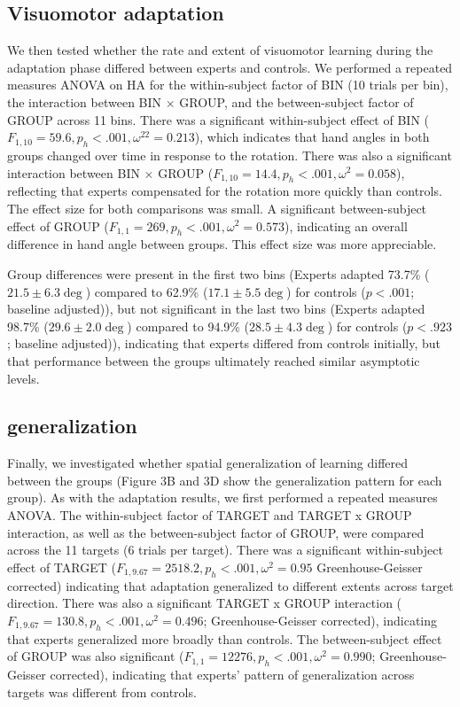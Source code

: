 \documentclass[jou, apacite, 11pt, longtable, floatsintext, notab]{apa6}
\begin{document}
\subsection{Visuomotor adaptation}
We then tested whether the rate and extent of visuomotor
learning during the adaptation phase differed between
experts and controls. We performed a repeated measures ANOVA
on HA for the within-subject factor of BIN (10 trials per
bin), the interaction between BIN $\times$ GROUP, and the
between-subject factor of GROUP across 11 bins. There was a
significant within-subject effect of BIN ($F_{1,10} = 59.6,
p_h <.001, \omega^22 = 0.213$), which indicates that hand
angles in both groups changed over time in response to the
rotation. There was also a significant interaction between
BIN $\times$ GROUP ($F_{1,10} = 14.4, p_h <.001, \omega^2 =
0.058$), reflecting that experts compensated for the
rotation more quickly than controls. The effect size for
both comparisons was small. A significant between-subject
effect of GROUP ($F_{1,1} = 269, p_h <.001, \omega^2 =
0.573$), indicating an overall difference in hand angle
between groups. This effect size was more appreciable.

Group differences were present in the first two bins
(Experts adapted 73.7\% ($21.5 \pm 6.3 \deg$) compared to
62.9\% ($17.1 \pm 5.5 \deg$) for controls ($p<.001$;
baseline adjusted)), but not significant in the last two
bins (Experts adapted 98.7\% ($29.6 \pm 2.0\deg$) compared
to 94.9\% ($28.5 \pm 4.3\deg$) for controls ($p<.923$;
baseline adjusted)), indicating that experts differed from
controls initially, but that performance between the groups
ultimately reached similar asymptotic levels.

\subsection{generalization}
Finally, we investigated whether spatial generalization of
learning differed between the groups (Figure 3B and 3D show
the generalization pattern for each group). As with the
adaptation results, we first performed a repeated measures
ANOVA. The within-subject factor of TARGET and TARGET x
GROUP interaction, as well as the between-subject factor of
GROUP, were compared across the 11 targets (6 trials per
target). There was a significant within-subject effect of
TARGET ($F_{1,9.67} = 2518.2, p_h <.001, \omega^2 = 0.95$
Greenhouse-Geisser corrected) indicating that adaptation
generalized to different extents across target direction.
There was also a significant TARGET x GROUP interaction
($F_{1,9.67} = 130.8, p_h <.001, \omega^2 = 0.496$;
Greenhouse-Geisser corrected), indicating that experts
generalized more broadly than controls. The between-subject
effect of GROUP was also significant ($F_{1,1} = 12276, p_h
<.001, \omega^2 = 0.990$; Greenhouse-Geisser corrected),
indicating that experts’ pattern of generalization across
targets was different from controls.
\end{document}
